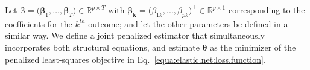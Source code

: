 \documentclass[
  12pt]{article}
\def\R{\mathbb{R}}
\def\M{\mathbf{m}}
\def\X{\mathbf{x}}
\def\Y{\mathbf{y}}
\def\Z{\mathbf{z}}
\begin{document}
Let $\bm{\beta} = \big( \bm{\beta}_{1}, \ldots, \bm{\beta}_{T} \big) \in \R^{p \times T}$ with $\bm{\beta_{k}} = \big( \beta_{1k}, ..., \beta_{pk} \big)^{\top} \in \R^{p \times 1}$ corresponding to the coefficients for the $k^{th}$ outcome; and let the other parameters be defined in a similar way. We define a joint penalized estimator that simultaneously incorporates both structural equations, and estimate $\bm{\theta}$ as the minimizer of the penalized least-squares objective in Eq.~\eqref{equa:elastic.net:loss.function}. %

\end{document}
